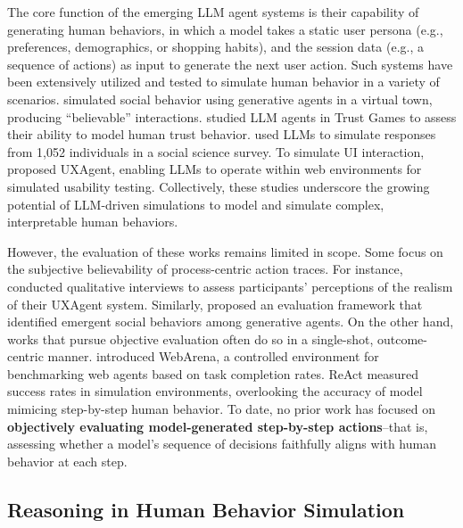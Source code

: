 \documentclass{article} %
\begin{document}
The core function of the emerging LLM agent systems is their capability of generating human behaviors, in which a model takes a static user persona (e.g., preferences, demographics, or shopping habits), and the session data (e.g., a sequence of actions) as input to generate the next user action.
Such systems have been extensively utilized and tested to simulate human behavior in a variety of scenarios.
\citet{parkGenerativeAgentsInteractive2023} simulated social behavior using generative agents in a virtual town, producing ``believable'' interactions.  
\citet{xieCanLargeLanguage2024} studied LLM agents in Trust Games to assess their ability to model human trust behavior.  
\citet{parkGenerativeAgentSimulations2024} used LLMs to simulate responses from 1,052 individuals in a social science survey.  
To simulate UI interaction, \citet{luUXAgentLLMAgentBased2025} proposed UX\-Agent, enabling LLMs to operate within web environments for simulated usability testing.
Collectively, these studies underscore the growing potential of LLM-driven simulations to model and simulate complex, interpretable human behaviors.


However, the evaluation of these works remains limited in scope. Some focus on the subjective believability of process-centric action traces. 
For instance, \citet{luUXAgentLLMAgentBased2025} conducted qualitative interviews to assess participants' perceptions of the realism of their UXAgent system.
Similarly, \citet{parkGenerativeAgentsInteractive2023} proposed an evaluation framework that identified emergent social behaviors among generative agents.
On the other hand, works that pursue objective evaluation often do so in a single-shot, outcome-centric manner.
\citet{zhouWebArenaRealisticWeb2024} introduced WebArena, a controlled environment for benchmarking web agents based on task completion rates. ReAct \cite{yaoReActSynergizingReasoning2023} measured success rates in simulation environments, overlooking the accuracy of model mimicing step-by-step human behavior.
To date, no prior work has focused on \textbf{objectively evaluating model-generated step-by-step actions}--that is, assessing whether a model's sequence of decisions faithfully aligns with human behavior at each step.

\subsection{Reasoning in Human Behavior Simulation}  
\end{document}

